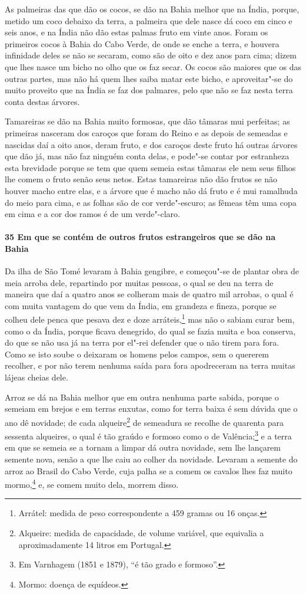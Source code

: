 \begin{linenumbers}
As palmeiras das que dão os cocos, se dão na Bahia melhor que na Índia, porque, metido um
coco debaixo da terra, a palmeira que dele nasce dá coco em cinco e seis anos, e na Índia
não dão estas palmas fruto em vinte anos. Foram os primeiros cocos à Bahia do Cabo Verde,
de onde se enche a terra, e houvera infinidade deles se não se secaram, como são de oito e
dez anos para cima; dizem que lhes nasce um bicho no olho que os faz secar. Os cocos são
maiores que os das outras partes, mas não há quem lhes saiba matar este bicho, e
aproveitar"-se do muito proveito que na Índia se faz dos palmares, pelo que não se faz
nesta terra conta destas árvores.

Tamareiras se dão na Bahia muito formosas, que dão tâmaras mui perfeitas; as primeiras
nasceram dos caroços que foram do Reino e as depois de semeadas e nascidas daí a oito
anos, deram fruto, e dos caroços deste fruto há outras árvores que dão já, mas não faz
ninguém conta delas, e pode"-se contar por estranheza esta brevidade porque se tem que quem
semeia estas tâmaras ele nem seus filhos lhe comem o fruto senão seus netos. Estas
tamareiras não dão frutos se não houver macho entre elas, e a árvore que é macho não dá
fruto e é mui ramalhuda do meio para cima, e as folhas são de cor verde"-escuro; as fêmeas
têm uma copa em cima e a cor dos ramos é de um verde"-claro.

\paragraph{35 Em que se contém de outros frutos estrangeiros que se dão na Bahia}\quad
Da ilha de São Tomé levaram à Bahia gengibre, e começou"-se de plantar obra de meia arroba
dele, repartindo por muitas pessoas, o qual se deu na terra de maneira que daí a quatro
anos se colheram mais de quatro mil arrobas, o qual é com muita vantagem do que vem da
Índia, em grandeza e fineza, porque se colheu dele penca que pesava dez e doze
arráteis,\footnote{ Arrátel: medida de peso correspondente a 459 gramas ou 16 onças.} mas
não o sabiam curar bem, como o da Índia, porque ficava denegrido, do qual se fazia muita e
boa conserva, do que se não usa já na terra por el"-rei defender que o não tirem para fora.
Como se isto soube o deixaram os homens pelos campos, sem o quererem recolher, e por não
terem nenhuma saída para fora apodreceram na terra muitas lájeas cheias dele.

Arroz se dá na Bahia melhor que em outra nenhuma parte sabida, porque o semeiam em brejos
e em terras enxutas, como for terra baixa é sem dúvida que o ano dê novidade; de cada
alqueire\footnote{ Alqueire: medida de capacidade, de volume variável, que equivalia a
aproximadamente 14 litros em Portugal.} de semeadura se recolhe de quarenta para sessenta
alqueires, o qual é tão graúdo e formoso como o de Valência;\footnote{ Em Varnhagem (1851
e 1879), ``é tão grado e formoso''.} e a terra em que se semeia se a tornam a limpar dá
outra novidade, sem lhe lançarem semente nova, senão a que lhe caiu ao colher da novidade.
Levaram a semente do arroz ao Brasil do Cabo Verde, cuja palha se a comem os cavalos lhes
faz muito mormo,\footnote{ Mormo: doença de equídeos.} e, se comem muito dela, morrem disso.


\end{linenumbers}
